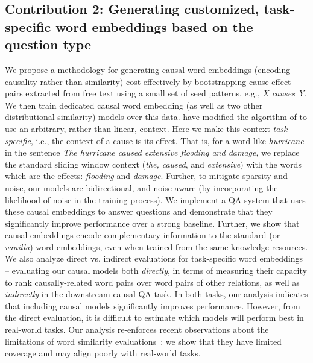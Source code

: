 \subsection{Contribution 2: Generating customized, task-specific word embeddings based on the question type} We propose a methodology for generating causal word-embeddings (encoding causality rather than similarity) cost-effectively by bootstrapping cause-effect pairs extracted from free text using a small set of seed patterns, e.g., {\em X causes Y}. 
We then train dedicated causal word embedding (as well as two other distributional similarity) models over this data. \citet{levy2014dependency} have modified the algorithm of\citet{mikolov2013distributed} to use an arbitrary, rather than linear, context. Here we make this context \emph{task-specific}, i.e., the context of a cause is its effect.  That is, for a word like \emph{hurricane} in the sentence \emph{The hurricane caused extensive flooding and damage}, we replace the standard sliding window context (\emph{the, caused}, and \emph{extensive}) with the words which are the effects: \emph{flooding} and \emph{damage}. 
Further, to mitigate sparsity and noise, our models are bidirectional, and noise-aware (by incorporating the likelihood of noise in the training process). 
We implement a QA system that uses these causal embeddings to answer questions and demonstrate that they significantly improve performance over a strong baseline. Further, we show that causal embeddings encode complementary information to the standard (or \emph{vanilla}) word-embeddings, even when trained from the same knowledge resources. 
We also analyze direct vs. indirect evaluations for task-specific word embeddings -- evaluating our causal models both  {\em directly}, in terms of measuring their capacity to rank causally-related word pairs over word pairs of other relations, as well as {\em indirectly} in the downstream causal QA task. 
In both tasks, our analysis indicates that including causal models significantly improves performance. 
However, from the direct evaluation, it is difficult to estimate which models will perform best in real-world tasks. Our analysis re-enforces recent observations about the limitations of word similarity evaluations~\citep{faruqui2016problems}: we show that they have limited coverage and may align poorly with real-world tasks.

